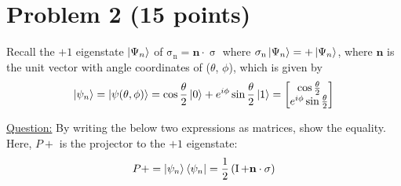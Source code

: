 \documentclass[11pt]{article}
\begin{document}
\section*{Problem 2 (15 points)}
Recall the $+1$ eigenstate $\ket{\Psi_n}$ of $\operatorname{\sigma_n} = \mathbf{n} \cdot \operatorname{\sigma}$ where $\operatorname{\sigma_n}\ket{\Psi_n} = + \ket{\Psi_n}$, where $\mathbf{n}$ is the unit vector with angle coordinates of ($\theta$, $\phi$), which is given by
\[\ket{\psi_n} = \ket{\psi(\theta, \phi)} = \cos{\frac{\theta}{2}}\ket{0} + e^{i\phi}\sin{\frac{\theta}{2}}\ket{1} = \begin{bmatrix}\cos{\frac{\theta}{2}} \\ e^{i\phi}\sin{\frac{\theta}{2}}\end{bmatrix}\]

\underline{Question:} By writing the below two expressions as matrices, show the equality. Here, $P+$ is the projector to the $+1$ eigenstate: \[P+ = \ket{\psi_n}\bra{\psi_n} = \frac{1}{2}\left(\operatorname{I} + \mathbf{n} \cdot \operatorname{\sigma}\right)\]
\end{document}
